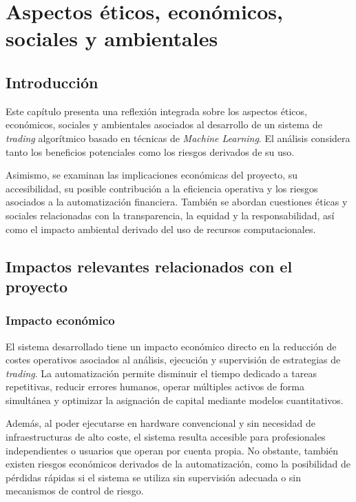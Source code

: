 \setlength{\parindent}{0em}

\chapter{Aspectos éticos, económicos, sociales y ambientales}\label{cap6}\thispagestyle{fancy}

\vspace{-1.3cm}

\section{Introducción}

Este capítulo presenta una reflexión integrada sobre los aspectos éticos, económicos, sociales y ambientales asociados al desarrollo de un sistema de
\textit{trading} algorítmico basado en técnicas de \textit{Machine Learning}. El análisis considera tanto los beneficios potenciales como los riesgos
derivados de su uso.

Asimismo, se examinan las implicaciones económicas del proyecto, su accesibilidad, su posible contribución a la eficiencia operativa y los riesgos
asociados a la automatización financiera. También se abordan cuestiones éticas y sociales relacionadas con la transparencia, la equidad y la
responsabilidad, así como el impacto ambiental derivado del uso de recursos computacionales.

\section{Impactos relevantes relacionados con el proyecto}

\subsection{Impacto económico}

El sistema desarrollado tiene un impacto económico directo en la reducción de costes operativos asociados al análisis, ejecución y supervisión de
estrategias de \textit{trading}. La automatización permite disminuir el tiempo dedicado a tareas repetitivas, reducir errores humanos, operar
múltiples activos de forma simultánea y optimizar la asignación de capital mediante modelos cuantitativos.

Además, al poder ejecutarse en hardware convencional y sin necesidad de infraestructuras de alto coste, el sistema resulta accesible para
profesionales independientes o usuarios que operan por cuenta propia. No obstante, también existen riesgos económicos derivados de la automatización,
como la posibilidad de pérdidas rápidas si el sistema se utiliza sin supervisión adecuada o sin mecanismos de control de riesgo.

